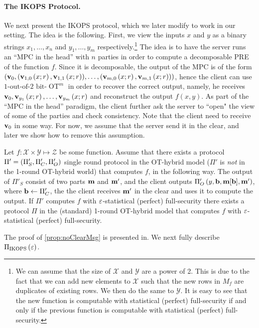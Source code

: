 \documentclass{llncs}
\newcommand{\OT}{\operatorname{OT}}
\newcommand{\bOT}[2]{#1\text{-out-of-}#2\text{ bit-}\OT}
\newcommand{\X}{\mathcal{X}}
\newcommand{\Y}{\mathcal{Y}}
\renewcommand{\Z}{\mathcal{Z}}
\renewcommand{\v}{\myvec{v}}
\renewcommand{\b}{\myvec{b}}
\newcommand{\m}{\myvec{m}}
\newcommand{\IKOPS}{\operatorname{IKOPS}}
\begin{document}
\paragraph{The IKOPS Protocol.}
We next present the IKOPS protocol, which we later modify to work in our setting. The idea is the following. First, we view the inputs $x$ and $y$ as a binary strings $x_1,\ldots,x_n$ and $y_1,\ldots,y_m$ respectively.\footnote{We can assume \wlg that the size of $\X$ and $\Y$ are a power of 2. This is due to the fact that we can add new elements to $\X$ such that the new rows in $M_f$ are duplicates of existing rows. We then do the same to $\Y$. It is easy to see that the new function is computable with statistical (perfect) full-security if and only if the previous function is computable with statistical (perfect) full-security.} The idea is to have the server runs an ``MPC in the head'' with $n$ parties in order to compute a decomposable PRE of the function $f$. Since it is decomposable, the output of the MPC is of the form $\vect{\v_0,(\v_{1,0}\of{x;r},\v_{1,1}\of{x;r}),\ldots,(\v_{m,0}\of{x;r},\v_{m,1}\of{x;r})}$, hence the client can use $\bOT12^{m}$ in order to recover the correct output, namely, he receives $\v_0,\v_{y_1}\of{x;r},\ldots,\v_{y_m}\of{x;r}$ and reconstruct the output $f(x,y)$. As part of the ``MPC in the head'' paradigm, the client further ask the server to ``open" the view of some of the parties and check consistency. Note that the client need to receive $\v_0$ in some way. For now, we assume that the server send it in the clear, and later we show how to remove this assumption.
\begin{proposition}\label{prop:noClearMsg}
Let $f:\X\times\Y\mapsto\Z$ be some function. Assume that there exists a protocol $\Pi'=\left ( \Pi'_S,\Pi'_C,\Pi'_O \right )$ single round protocol in the OT-hybrid model ($\Pi'$ is \emph{not} in the 1-round OT-hybrid world) that computes $f$, in the following way. The output of $\Pi'_S$ consist of two parts $\m$ and $\m'$, and the client outputs $\Pi'_O\of{y,\b,\m[\b],\m'}$, where $\b\from\Pi'_C$, \ie the the client receives $\m'$ in the clear and uses it to compute the output. If $\Pi'$ computes $f$ with $\varepsilon$-statistical (perfect) full-security there exists a protocol $\Pi$ in the (standard) 1-round OT-hybrid model that computes $f$ with $\varepsilon$-statistical (perfect) full-security.
\end{proposition}

The proof of \cref{prop:noClearMsg} is presented in. We next fully describe $\Pi_{\IKOPS}\of{\eps}$.
\end{document}
